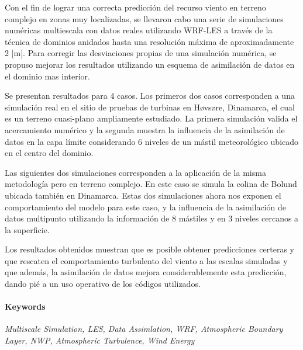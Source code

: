 \color{red}Con el fin de lograr una correcta predicción del recurso viento en terreno complejo en zonas muy localizadas, se llevaron cabo una serie de simulaciones numéricas multiescala con datos reales utilizando WRF-LES a través de la técnica de dominios anidados hasta una resolución máxima de aproximadamente 2 [m]. Para corregir las desviaciones propias de una simulación numérica, se propuso mejorar los resultados utilizando un esquema de asimilación de datos en el dominio mas interior.

Se presentan resultados para 4 casos. Los primeros dos casos corresponden a una simulación real en el sitio de pruebas de turbinas en Høvsøre, Dinamarca, el cual es un terreno cuasi-plano ampliamente estudiado. La primera simulación valida el acercamiento numérico y la segunda muestra la influencia de la asimilación de datos en la capa límite considerando 6 niveles de un mástil meteorológico ubicado en el centro del dominio.

Las siguientes dos simulaciones corresponden a la aplicación de la misma metodología pero en terreno complejo. En este caso se simula la colina de Bolund ubicada también en Dinamarca. Estas dos simulaciones ahora nos exponen el comportamiento del modelo para este caso, y la influencia de la asimilación de datos multipunto utilizando la información de 8 mástiles y en 3 niveles cercanos a la superficie.

Los resultados obtenidos muestran que es posible obtener predicciones certeras y que rescaten el comportamiento turbulento del viento a las escalas simuladas y que además, la asimilación de datos mejora considerablemente esta predicción, dando pié a un uso operativo de los códigos utilizados.

\color{black}
\paragraph{Keywords} \emph{Multiscale Simulation, LES, Data Assimlation, WRF, Atmospheric Boundary Layer, NWP, Atmospheric Turbulence, Wind Energy}
